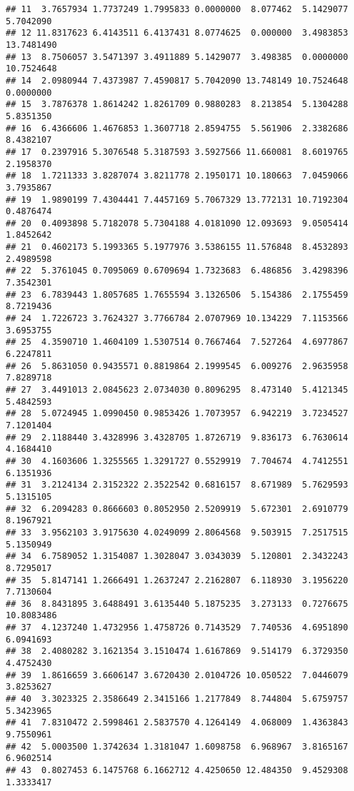 \documentclass[
]{article}
\begin{document}
\begin{verbatim}
## 11  3.7657934 1.7737249 1.7995833 0.0000000  8.077462  5.1429077  5.7042090
## 12 11.8317623 6.4143511 6.4137431 8.0774625  0.000000  3.4983853 13.7481490
## 13  8.7506057 3.5471397 3.4911889 5.1429077  3.498385  0.0000000 10.7524648
## 14  2.0980944 7.4373987 7.4590817 5.7042090 13.748149 10.7524648  0.0000000
## 15  3.7876378 1.8614242 1.8261709 0.9880283  8.213854  5.1304288  5.8351350
## 16  6.4366606 1.4676853 1.3607718 2.8594755  5.561906  2.3382686  8.4382107
## 17  0.2397916 5.3076548 5.3187593 3.5927566 11.660081  8.6019765  2.1958370
## 18  1.7211333 3.8287074 3.8211778 2.1950171 10.180663  7.0459066  3.7935867
## 19  1.9890199 7.4304441 7.4457169 5.7067329 13.772131 10.7192304  0.4876474
## 20  0.4093898 5.7182078 5.7304188 4.0181090 12.093693  9.0505414  1.8452642
## 21  0.4602173 5.1993365 5.1977976 3.5386155 11.576848  8.4532893  2.4989598
## 22  5.3761045 0.7095069 0.6709694 1.7323683  6.486856  3.4298396  7.3542301
## 23  6.7839443 1.8057685 1.7655594 3.1326506  5.154386  2.1755459  8.7219436
## 24  1.7226723 3.7624327 3.7766784 2.0707969 10.134229  7.1153566  3.6953755
## 25  4.3590710 1.4604109 1.5307514 0.7667464  7.527264  4.6977867  6.2247811
## 26  5.8631050 0.9435571 0.8819864 2.1999545  6.009276  2.9635958  7.8289718
## 27  3.4491013 2.0845623 2.0734030 0.8096295  8.473140  5.4121345  5.4842593
## 28  5.0724945 1.0990450 0.9853426 1.7073957  6.942219  3.7234527  7.1201404
## 29  2.1188440 3.4328996 3.4328705 1.8726719  9.836173  6.7630614  4.1684410
## 30  4.1603606 1.3255565 1.3291727 0.5529919  7.704674  4.7412551  6.1351936
## 31  3.2124134 2.3152322 2.3522542 0.6816157  8.671989  5.7629593  5.1315105
## 32  6.2094283 0.8666603 0.8052950 2.5209919  5.672301  2.6910779  8.1967921
## 33  3.9562103 3.9175630 4.0249099 2.8064568  9.503915  7.2517515  5.1350949
## 34  6.7589052 1.3154087 1.3028047 3.0343039  5.120801  2.3432243  8.7295017
## 35  5.8147141 1.2666491 1.2637247 2.2162807  6.118930  3.1956220  7.7130604
## 36  8.8431895 3.6488491 3.6135440 5.1875235  3.273133  0.7276675 10.8083486
## 37  4.1237240 1.4732956 1.4758726 0.7143529  7.740536  4.6951890  6.0941693
## 38  2.4080282 3.1621354 3.1510474 1.6167869  9.514179  6.3729350  4.4752430
## 39  1.8616659 3.6606147 3.6720430 2.0104726 10.050522  7.0446079  3.8253627
## 40  3.3023325 2.3586649 2.3415166 1.2177849  8.744804  5.6759757  5.3423965
## 41  7.8310472 2.5998461 2.5837570 4.1264149  4.068009  1.4363843  9.7550961
## 42  5.0003500 1.3742634 1.3181047 1.6098758  6.968967  3.8165167  6.9602514
## 43  0.8027453 6.1475768 6.1662712 4.4250650 12.484350  9.4529308  1.3333417

\end{verbatim}
\end{document}
